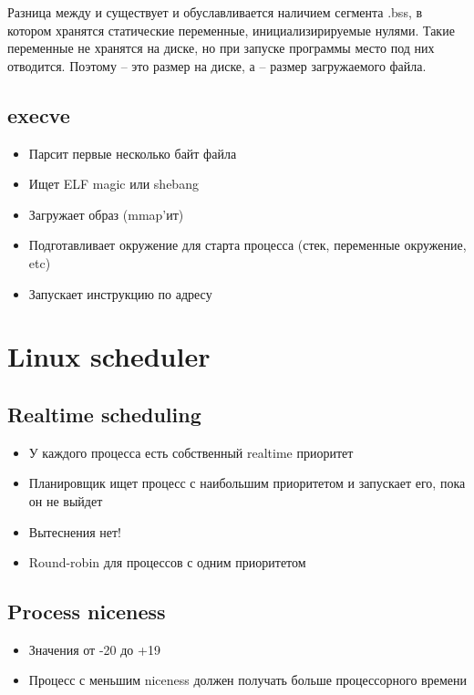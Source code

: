 Разница между  и  существует и обуславливается наличием сегмента .bss, в котором хранятся статические переменные, инициализирируемые нулями. Такие переменные не хранятся на диске, но при запуске программы место под них отводится. Поэтому  -- это размер на диске, а  -- размер загружаемого файла.

\subsection{execve}
  \begin{itemize}
    \item Парсит первые несколько байт файла
    \item Ищет ELF magic или shebang
    \item Загружает образ (mmap'ит)
    \item Подготавливает окружение для старта процесса (стек, переменные окружение, etc)
    \item Запускает инструкцию по адресу 
  \end{itemize}
  
\section{Linux scheduler}
  \subsection{Realtime scheduling}
    \begin{itemize}
      \item У каждого процесса есть собственный realtime приоритет
      \item Планировщик ищет процесс с наибольшим приоритетом и запускает его, пока он не выйдет
      \item Вытеснения нет!
      \item Round-robin для процессов с одним приоритетом
    \end{itemize}
  
  \subsection{Process niceness}
    \begin{itemize}
      \item Значения от -20 до +19
      \item Процесс с меньшим niceness должен получать больше процессорного времени
    \end{itemize}
  
